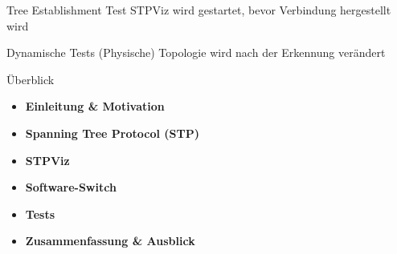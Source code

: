 \documentclass{beamer}
\begin{document}
\begin{frame}{Tree Establishment Test}
    STPViz wird gestartet, bevor Verbindung hergestellt wird\\
    \pause
    \vspace{0.3cm}
    \centering
    \scalebox{0.8}{
        
    }
\end{frame}

\begin{frame}{Dynamische Tests}
    (Physische) Topologie wird nach der Erkennung verändert\\
    \vspace{0.3cm}
    \centering
\end{frame}

\begin{frame}{Überblick}
    \begin{itemize}
        \item \textbf{Einleitung \& Motivation}
        \item \textbf{Spanning Tree Protocol (STP)}
        \item \textbf{STPViz}
        \item \textbf{Software-Switch}
        \item \textbf{Tests}
        \item \alert{\textbf{Zusammenfassung \& Ausblick}}
    \end{itemize}
\end{frame}
\end{document}
